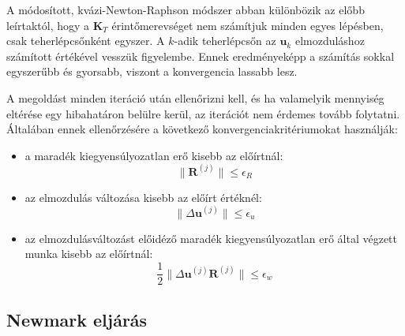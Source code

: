 A módosított, kvázi-Newton-Raphson módszer abban különbözik az előbb leírtaktól, hogy a $\mathbf{K}_T$ érintőmerevséget nem számítjuk minden egyes  lépésben, csak teherlépcsőnként egyszer. A $k$-adik teherlépcsőn az $\mathbf{u}_{k}$ elmozduláshoz számított értékével vesszük figyelembe. Ennek eredményeképp a számítás sokkal egyszerűbb és gyorsabb, viszont a konvergencia lassabb lesz.

A megoldást minden iteráció után ellenőrizni kell, és ha valamelyik mennyiség eltérése egy hibahatáron belülre kerül, az iterációt nem érdemes tovább folytatni. Általában ennek ellenőrzésére a következő konvergenciakritériumokat használják:
\begin{itemize}
\item a maradék kiegyensúlyozatlan erő kisebb az előírtnál:
\begin{equation*}
\parallel \mathbf{R}^{(j)} \parallel \leq \epsilon_R
\end{equation*}
\item az elmozdulás változása kisebb az előírt értéknél:
\begin{equation*}
\parallel \Delta{\mathbf{u}}^{(j)} \parallel \leq \epsilon_u
\end{equation*}
\item az elmozdulásváltozást előidéző maradék kiegyensúlyozatlan erő által végzett munka kisebb az előírtnál:
\begin{equation*}
\frac{1}{2}\parallel \Delta{\mathbf{u}}^{(j)}\mathbf{R}^{(j)} \parallel \leq \epsilon_w
\end{equation*}
\end{itemize}

\subsection{Newmark eljárás}

{\ }

